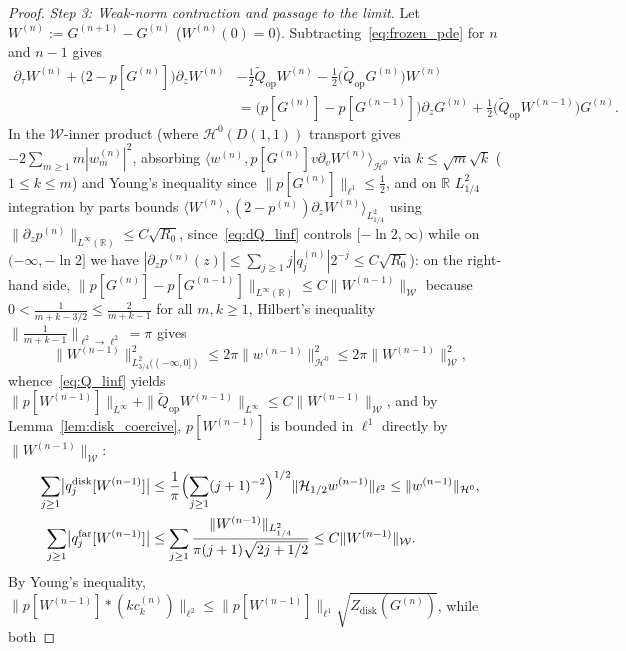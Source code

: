 \documentclass[11pt,a4paper]{article}
\begin{document}
\begin{proof}
\emph{Step 3: Weak-norm contraction and passage to the limit.}
Let $W^{(n)} := G^{(n+1)} - G^{(n)}$ ($W^{(n)}(0)=0$). Subtracting~\eqref{eq:frozen_pde} for $n$ and $n-1$ gives
\begin{align*}
\partial_\tau W^{(n)} + \bigl(2-p[G^{(n)}]\bigr)\partial_z W^{(n)}
  &- \frac{1}{2}\widetilde{Q}_{\mathrm{op}}W^{(n)} - \frac{1}{2}\bigl(\widetilde{Q}_{\mathrm{op}}G^{(n)}\bigr)W^{(n)} \\
  &= \bigl(p[G^{(n)}]-p[G^{(n-1)}]\bigr)\partial_z G^{(n)} + \tfrac{1}{2}\bigl(\widetilde{Q}_{\mathrm{op}}W^{(n-1)}\bigr)G^{(n)}.
\end{align*}
In the $\mathcal{W}$-inner product (where $\mathcal{H}^0(D(1,1))$ transport gives $-2\sum_{m\ge 1} m|w_m^{(n)}|^2$,
absorbing $\langle w^{(n)}, p[G^{(n)}]v\partial_v W^{(n)}\rangle_{\mathcal{H}^0}$ via $k\le\sqrt{m}\sqrt{k}$ ($1\le k\le m$) and Young's inequality since $\|p[G^{(n)}]\|_{\ell^1}\le\frac{1}{2}$, and on $\mathbb{R}$
$L^2_{1/4}$ integration by parts bounds $\langle W^{(n)}, (2-p^{(n)})\partial_z W^{(n)}\rangle_{L^2_{1/4}}$ using
$\|\partial_z p^{(n)}\|_{L^\infty(\mathbb{R})}\le C\sqrt{R_0}$, since~\eqref{eq:dQ_linf} controls $[-\ln 2,\infty)$ while
on $(-\infty,-\ln 2]$ we have $|\partial_z p^{(n)}(z)|\le\sum_{j\ge 1}j|q_j^{(n)}|2^{-j}\le C\sqrt{R_0}$): on the right-hand side,
$\|p[G^{(n)}]-p[G^{(n-1)}]\|_{L^\infty(\mathbb{R})}\le C\|W^{(n-1)}\|_{\mathcal{W}}$ because $0 < \frac{1}{m+k-3/2} \le \frac{2}{m+k-1}$ for all $m,k\ge 1$, Hilbert's inequality
$\|\frac{1}{m+k-1}\|_{\ell^2\to\ell^2}=\pi$ gives
\[
\|W^{(n-1)}\|_{L^2_{3/4}((-\infty,0])}^2 \le 2\pi\|w^{(n-1)}\|_{\mathcal{H}^0}^2 \le 2\pi\|W^{(n-1)}\|_{\mathcal{W}}^2,
\]
whence~\eqref{eq:Q_linf} yields
$\|p[W^{(n-1)}]\|_{L^\infty}+\|\widetilde{Q}_{\mathrm{op}}W^{(n-1)}\|_{L^\infty}\le C\|W^{(n-1)}\|_{\mathcal{W}}$, 
and by Lemma~\ref{lem:disk_coercive}, $p[W^{(n-1)}]$ is bounded in $\ell^1$ directly by $\|W^{(n-1)}\|_{\mathcal{W}}$:
\begin{align*}
\sum_{j\ge 1}\bigl|q_j^{\mathrm{disk}}[W^{(n-1)}]\bigr|
  &\le \frac{1}{\pi}\Bigl(\sum_{j\ge 1}(j+1)^{-2}\Bigr)^{1/2}\|\mathcal{H}_{1/2}w^{(n-1)}\|_{\ell^2} \le \|w^{(n-1)}\|_{\mathcal{H}^0}, \\
\sum_{j\ge 1}\bigl|q_j^{\mathrm{far}}[W^{(n-1)}]\bigr|
  &\le \sum_{j\ge 1}\frac{\|W^{(n-1)}\|_{L^2_{1/4}}}{\pi(j+1)\sqrt{2j+1/2}} \le C\|W^{(n-1)}\|_{\mathcal{W}}.
\end{align*}
By Young's inequality, $\|p[W^{(n-1)}]*(k c_k^{(n)})\|_{\ell^2}\le\|p[W^{(n-1)}]\|_{\ell^1}\sqrt{Z_{\mathrm{disk}}(G^{(n)})}$, while both

\end{proof}
\end{document}
